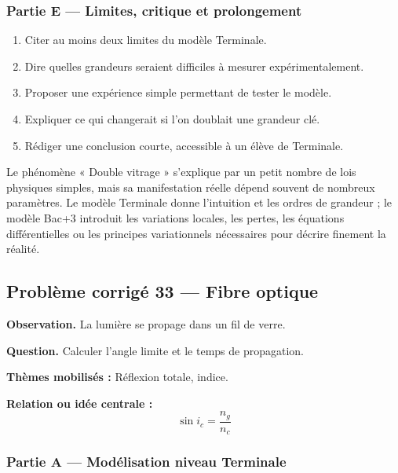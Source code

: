 \documentclass[11pt,a4paper]{article}
\begin{document}
\subsubsection*{Partie E — Limites, critique et prolongement}

\begin{enumerate}
  \item Citer au moins deux limites du modèle Terminale.
  \item Dire quelles grandeurs seraient difficiles à mesurer expérimentalement.
  \item Proposer une expérience simple permettant de tester le modèle.
  \item Expliquer ce qui changerait si l'on doublait une grandeur clé.
  \item Rédiger une conclusion courte, accessible à un élève de Terminale.
\end{enumerate}

\begin{corrigebox}
Le phénomène « Double vitrage » s'explique par un petit nombre de lois physiques simples, mais sa manifestation réelle dépend souvent de nombreux paramètres. Le modèle Terminale donne l'intuition et les ordres de grandeur ; le modèle Bac+3 introduit les variations locales, les pertes, les équations différentielles ou les principes variationnels nécessaires pour décrire finement la réalité.
\end{corrigebox}

\subsection{Problème corrigé 33 — Fibre optique}

\begin{exercicebox}
\textbf{Observation.} La lumière se propage dans un fil de verre.

\medskip
\textbf{Question.} Calculer l'angle limite et le temps de propagation.

\medskip
\textbf{Thèmes mobilisés :} Réflexion totale, indice.

\medskip
\textbf{Relation ou idée centrale :}
\[
\sin i_c=\frac{n_g}{n_c}
\]
\end{exercicebox}

\subsubsection*{Partie A — Modélisation niveau Terminale}
\end{document}
